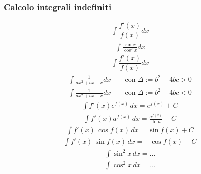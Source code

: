 \documentclass[letterpaper,10pt,english]{jupyterBook}
\begin{document}
\subsubsection{Calcolo integrali indefiniti}
\label{\detokenize{ch/infinitesimal_calculus/integrals-problems:calcolo-integrali-indefiniti}}\begin{equation*}
\begin{split}\int \dfrac{f'(x)}{f(x)} dx\end{split}
\end{equation*}\begin{equation*}
\begin{split}\int \frac{\sin x}{\cos^2 x} dx\end{split}
\end{equation*}\begin{equation*}
\begin{split}\int \dfrac{f'(x)}{f(x)} dx\end{split}
\end{equation*}\begin{equation*}
\begin{split}\int \frac{1}{a x^2 + b x + c} dx \qquad \text{con } \Delta := b^2 - 4 bc > 0\end{split}
\end{equation*}\begin{equation*}
\begin{split}\int \frac{1}{a x^2 + b x + c} dx \qquad \text{con } \Delta := b^2 - 4 bc < 0\end{split}
\end{equation*}\begin{equation*}
\begin{split}\int f'(x) e^{f(x)} \, dx  = e^{f(x)} + C\end{split}
\end{equation*}\begin{equation*}
\begin{split}\int f'(x) a^{f(x)} \, dx  = \frac{a^{f(x)}}{\ln a} + C\end{split}
\end{equation*}\begin{equation*}
\begin{split}\int f'(x) \, \cos f(x) \, dx = \sin f(x) + C\end{split}
\end{equation*}\begin{equation*}
\begin{split}\int f'(x) \, \sin f(x) \, dx =-\cos f(x) + C\end{split}
\end{equation*}\begin{equation*}
\begin{split}\int \sin^2 x \, dx = \dots\end{split}
\end{equation*}\begin{equation*}
\begin{split}\int \cos^2 x \, dx = \dots\end{split}
\end{equation*}
\sphinxstepscope
\end{document}

